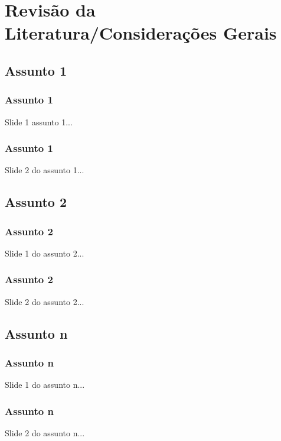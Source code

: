 \section{Revisão da Literatura/Considerações Gerais}


\subsection{Assunto 1}

\begin{frame}

    \frametitle{Assunto 1}

    Slide 1 assunto 1...

\end{frame}


\begin{frame}

    \frametitle{Assunto 1}

    Slide 2 do assunto 1...

\end{frame}


\subsection{Assunto 2}

\begin{frame}

    \frametitle{Assunto 2}

    Slide 1 do assunto 2...

\end{frame}


\begin{frame}

    \frametitle{Assunto 2}

    Slide 2 do assunto 2...

\end{frame}


\subsection{Assunto n}

\begin{frame}

    \frametitle{Assunto n}

    Slide 1 do assunto n...

\end{frame}


\begin{frame}

    \frametitle{Assunto n}

    Slide 2 do assunto n...

\end{frame}